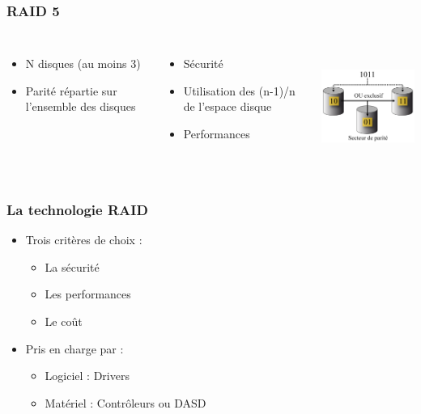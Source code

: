 \begin{frame}
\frametitle{RAID 5}
\begin{columns}
\begin{itemize}
\item N disques (au moins 3)
\item Parité répartie sur l’ensemble des disques
\end{itemize}
\begin{itemize}
\item Sécurité
\item Utilisation des (n-1)/n de l’espace disque
\item Performances
\end{itemize}
\includegraphics[height=4cm]{../illustration/RAID5.png}
\end{columns}
\end{frame}


\begin{frame}
\frametitle{La technologie RAID}
\begin{itemize}
\item Trois critères de choix :
\begin{itemize}
\item La sécurité
\item Les performances
\item Le coût
\end{itemize}
\item Pris en charge par :
\begin{itemize}
\item Logiciel : Drivers
\item Matériel : Contrôleurs ou DASD
\end{itemize}
\end{itemize}
\end{frame}

